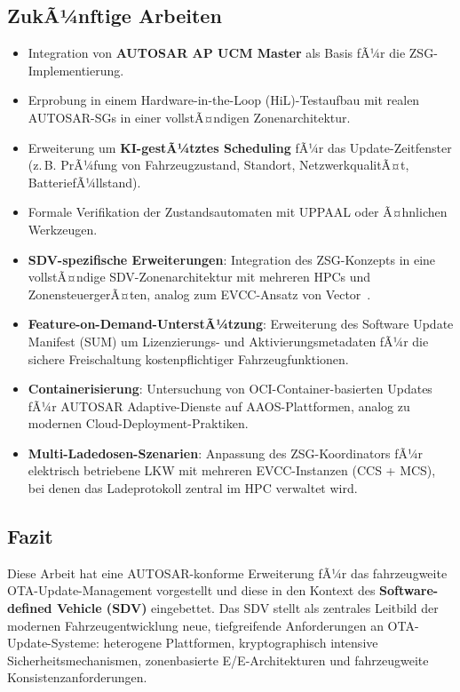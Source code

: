 ﻿\documentclass[12pt,a4paper,twoside]{article}
\begin{document}
\subsection{ZukÃ¼nftige Arbeiten}

\begin{itemize}
  \item Integration von \textbf{AUTOSAR AP UCM Master} als Basis fÃ¼r die
    ZSG-Implementie\-rung.
  \item Erprobung in einem Hardware-in-the-Loop (HiL)-Testaufbau mit
    realen AUTOSAR-SGs in einer vollstÃ¤ndigen Zonenarchitektur.
  \item Erweiterung um \textbf{KI-gestÃ¼tztes Scheduling} fÃ¼r das
    Update-Zeitfenster (z.\,B. PrÃ¼fung von Fahrzeugzustand, Standort,
    NetzwerkqualitÃ¤t, BatteriefÃ¼llstand).
  \item Formale Verifikation der Zustandsautomaten mit UPPAAL oder
    Ã¤hnlichen Werkzeugen.
  \item \textbf{SDV-spezifische Erweiterungen}: Integration des ZSG-Konzepts
    in eine vollstÃ¤ndige SDV-Zonenarchitektur mit mehreren HPCs und
    ZonensteuergerÃ¤ten, analog zum EVCC-Ansatz von Vector~\cite{schneider2026ladekomm}.
  \item \textbf{Feature-on-Demand-UnterstÃ¼tzung}: Erweiterung des Software
    Update Manifest (SUM) um Lizenzierungs- und Aktivierungsmetadaten fÃ¼r
    die sichere Freischaltung kostenpflichtiger Fahrzeugfunktionen.
  \item \textbf{Containerisierung}: Untersuchung von OCI-Container-basierten
    Updates fÃ¼r AUTOSAR Adaptive-Dienste auf AAOS-Plattformen, analog zu
    modernen Cloud-Deployment-Praktiken.
  \item \textbf{Multi-Ladedosen-Szenarien}: Anpassung des ZSG-Koordinators
    fÃ¼r elektrisch betriebene LKW mit mehreren EVCC-Instanzen (CCS + MCS),
    bei denen das Ladeprotokoll zentral im HPC verwaltet wird.
\end{itemize}


\subsection{Fazit}
\label{sec:fazit}


Diese Arbeit hat eine AUTOSAR-konforme Erweiterung fÃ¼r das fahrzeugweite
OTA-Update-Management vorgestellt und diese in den Kontext des
\textbf{Software-defined Vehicle (SDV)} eingebettet. Das SDV stellt als
zentrales Leitbild der modernen Fahrzeugentwicklung neue, tiefgreifende
Anforderungen an OTA-Update-Systeme: heterogene Plattformen, kryptographisch
intensive Sicherheitsmechanismen, zonenbasierte E/E-Architekturen und
fahrzeugweite Konsistenzanforderungen.
\end{document}
